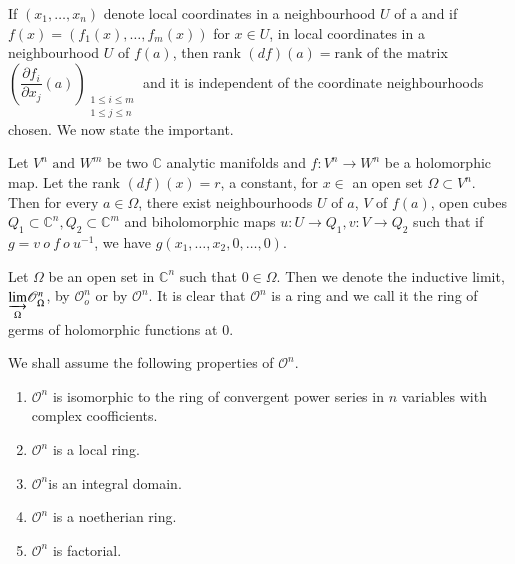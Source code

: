 \begin{remark*}%
  If $(x_{1}, \ldots , x_{n})$ denote local coordinates in a
  neighbourhood $U$ of a and if $f(x) = (f_{1}(x) , \ldots ,
  f_{m}(x))$ for $x \in U$, in local coordinates in a
  neighbourhood $U$ of $f(a)$, then rank $(df)(a) = \text{rank}$ of
  the matrix $(\dfrac{\partial f_{i}}{\partial x_{j}}
  (a))_{\substack{{1 \leq i \leq m}\\ {1 \leq j \leq n}}}$ and it is
  independent of the coordinate neighbourhoods chosen. We now state the
  important. 
\end{remark*}

\begin{theorem}\label{chap1-thm2} %
  Let $V^{n} \text{ and } W^{m}$ be two $\mathbb{C}$ analytic
  manifolds and $f : V^{n} \rightarrow W^{n}$ be a holomorphic
  map. Let the rank $(df)(x) = r$, a constant, for $x \in$ an open
  set $\Omega \subset V^{n}$. Then for every $a \in \Omega$, there
  exist neighbourhoods $U$ of $a$, $V$ of $f(a)$, open cubes $Q_{1}
  \subset \mathbb{C}^{n},Q_{2} \subset \mathbb{C}^{m}$ and
  biholomorphic maps $u:U \rightarrow Q_{1}, v:V \rightarrow Q_{2}$
  such that if $g = v ~o~ f~ o~ u^{-1}$, we have $g(x_{1}, \ldots ,
  x_{2}, 0, \ldots , 0)$. 
\end{theorem}

Let $\Omega$ be an open set in $\mathbb{C}^{n}$ such that $0 \in
\Omega$. Then we denote the inductive limit,  $
\underset{\Omega}{\varinjlim} \mathscr{O}^{n}_{\Omega}$, by
$\mathscr{O}^{n}_{o}$ or by $\mathscr{O}^{n}$. It is clear that
$\mathscr{O}^{n}$ is a ring and we call it the ring of germs of
holomorphic functions at $0$. 

We shall assume the following properties of $\mathscr{O}^{n}$.
\begin{enumerate}
\item $\mathscr{O}^{n}$ is isomorphic to the ring of convergent power
  series in $n$ variables with complex coofficients. 
\item $\mathscr{O}^{n}$ is a local ring.
\item $\mathscr{O}^{n}$\pageoriginale is an integral domain.
\item $\mathscr{O}^{n}$ is a noetherian ring.
\item $\mathscr{O}^{n}$ is factorial.
\end{enumerate}

